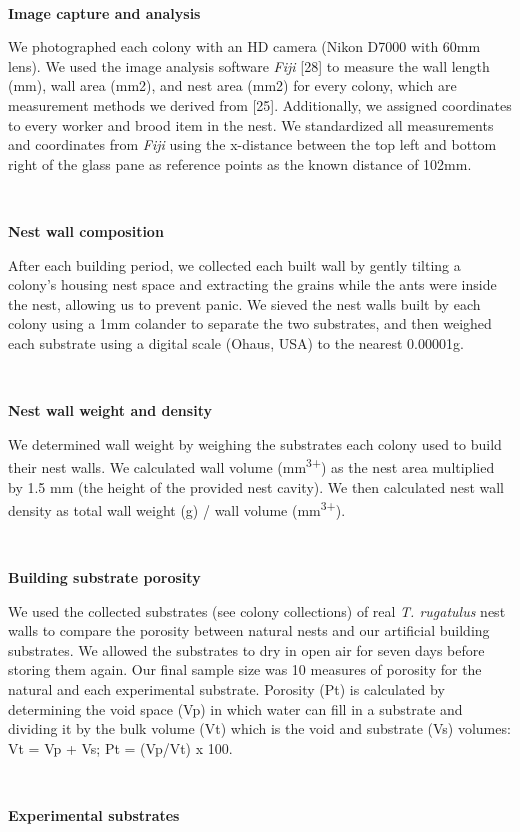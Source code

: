 \documentclass[3p]{elsarticle} %
\begin{document}
~

\textbf{Image capture and analysis}

We photographed each colony with an HD camera (Nikon D7000 with 60mm
lens). We used the image analysis software \emph{Fiji} {[}28{]} to
measure the wall length (mm), wall area (mm2), and nest area (mm2) for
every colony, which are measurement methods we derived from {[}25{]}.
Additionally, we assigned coordinates to every worker and brood item in
the nest. We standardized all measurements and coordinates from
\emph{Fiji} using the x-distance between the top left and bottom right
of the glass pane as reference points as the known distance of 102mm.

~

\textbf{Nest wall composition}

After each building period, we collected each built wall by gently
tilting a colony's housing nest space and extracting the grains while
the ants were inside the nest, allowing us to prevent panic. We sieved
the nest walls built by each colony using a 1mm colander to separate the
two substrates, and then weighed each substrate using a digital scale
(Ohaus, USA) to the nearest 0.00001g.

~

\textbf{Nest wall weight and density}

We determined wall weight by weighing the substrates each colony used to
build their nest walls. We calculated wall volume
(mm\textsuperscript{3+}) as the nest area multiplied by 1.5 mm (the
height of the provided nest cavity). We then calculated nest wall
density as total wall weight (g) / wall volume (mm\textsuperscript{3+}).

~

\textbf{Building substrate porosity}

We used the collected substrates (see colony collections) of real
\emph{T. rugatulus} nest walls to compare the porosity between natural
nests and our artificial building substrates. We allowed the substrates
to dry in open air for seven days before storing them again. Our final
sample size was 10 measures of porosity for the natural and each
experimental substrate. Porosity (Pt) is calculated by determining the
void space (Vp) in which water can fill in a substrate and dividing it
by the bulk volume (Vt) which is the void and substrate (Vs) volumes: Vt
= Vp + Vs; Pt = (Vp/Vt) x 100.

~

\textbf{Experimental substrates}
\end{document}
